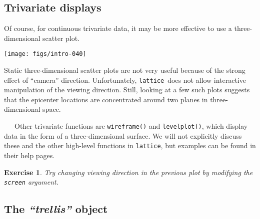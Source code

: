 \documentclass[10pt]{article}
\newcommand{\code}[1]{\texttt{#1}}
\newcommand{\lattice}{\code{lattice}}
\newcommand{\Rfunction}[1]{\code{#1()}}
\newcommand{\class}[1]{\textit{``#1''}}
\newtheorem{exercise}{Exercise}
\begin{document}
\newpage

\subsection*{Trivariate displays}

Of course, for continuous trivariate data, it may be more effective to
use a three-dimensional scatter plot.
\begin{Schunk}
\end{Schunk}
\begin{center}
\texttt{[image: figs/intro-040]}
\end{center}
Static three-dimensional scatter plots are not very useful because of
the strong effect of ``camera'' direction.  Unfortunately, \lattice\
does not allow interactive manipulation of the viewing direction.
Still, looking at a few such plots suggests that the epicenter
locations are concentrated around two planes in three-dimensional
space.


~~~Other trivariate functions are \Rfunction{wireframe} and
\Rfunction{levelplot}, which display data in the form of a
three-dimensional surface.  We will not explicitly discuss these and
the other high-level functions in \lattice, but examples can be found
in their help pages.  
\begin{exercise}
  Try changing viewing direction in the previous plot by modifying the
  \code{screen} argument.
\end{exercise}

\newpage



\subsection*{The \class{trellis} object}
\end{document}
